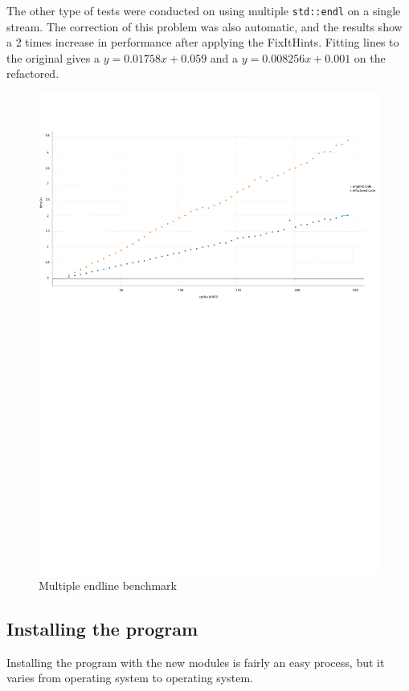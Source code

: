 \par The other type of tests were conducted on using multiple \verb|std::endl| on a single stream. The correction of this problem was also automatic, and the results show a 2 times increase in performance after applying the FixItHints. Fitting lines to the original gives a $y=0.01758x+0.059$ and a $y=0.008256x+0.001$ on the refactored. 
\begin{figure}[H]
	\caption{Multiple endline benchmark}
	\includegraphics[scale=0.7]{images/stream_endline_performance.pdf}
\end{figure}
\subsection{Installing the program}
Installing the program with the new modules is fairly an easy process, but it varies from operating system to operating system.
